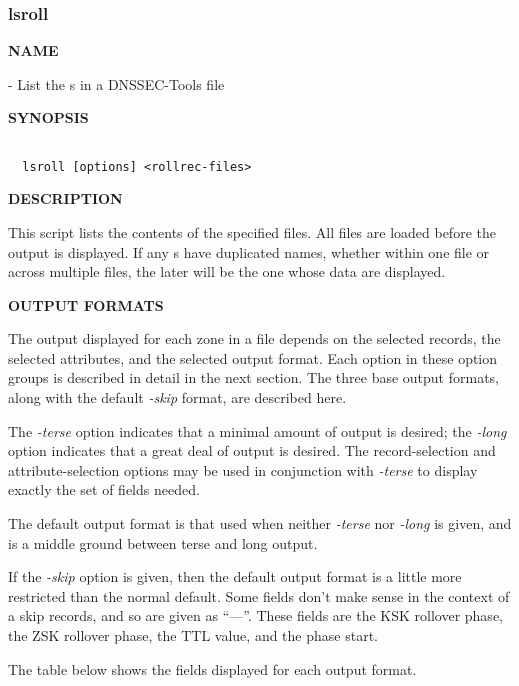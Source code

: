 \clearpage

\subsubsection{lsroll}

{\bf NAME}

 - List the s in a DNSSEC-Tools 
file

{\bf SYNOPSIS}

\begin{verbatim}

  lsroll [options] <rollrec-files>

\end{verbatim}

{\bf DESCRIPTION}

This script lists the contents of the specified  files.  All
 files are loaded before the output is displayed.  If any
s have duplicated names, whether within one file or across
multiple files, the later  will be the one whose data are
displayed.

{\bf OUTPUT FORMATS}

The output displayed for each zone in a  file depends on the
selected records, the selected attributes, and the selected output format.
Each option in these option groups is described in detail in the next section.
The three base output formats, along with the default {\it -skip} format, are
described here.

The {\it -terse} option indicates that a minimal amount of output is desired;
the {\it -long} option indicates that a great deal of output is desired.  The
record-selection and attribute-selection options may be used in conjunction
with {\it -terse} to display exactly the set of  fields needed.

The default output format is that used when neither {\it -terse} nor {\it -long}
is given, and is a middle ground between terse and long output.

If the {\it -skip} option is given, then the default output format is a little
more restricted than the normal default.  Some  fields don't
make sense in the context of a skip records, and so are given as ``---''.
These fields are the KSK rollover phase, the ZSK rollover phase, the TTL
value, and the phase start.

\eject

The table below shows the fields displayed for each output format.

